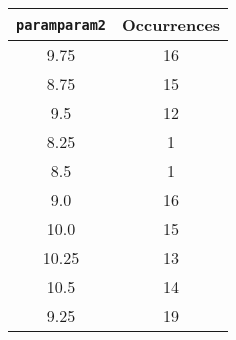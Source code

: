 \documentclass[letterpaper, 12pt]{article}
\begin{document}
\begin{longtable}{|c|c|}
\hline
\textbf{\texttt{paramparam2}} & \textbf{Occurrences} \\
\hline
9.75 & 16 \\
\hline
8.75 & 15 \\
\hline
9.5 & 12 \\
\hline
8.25 & 1 \\
\hline
8.5 & 1 \\
\hline
9.0 & 16 \\
\hline
10.0 & 15 \\
\hline
10.25 & 13 \\
\hline
10.5 & 14 \\
\hline
9.25 & 19 \\
\hline
\end{longtable}
\end{document}

